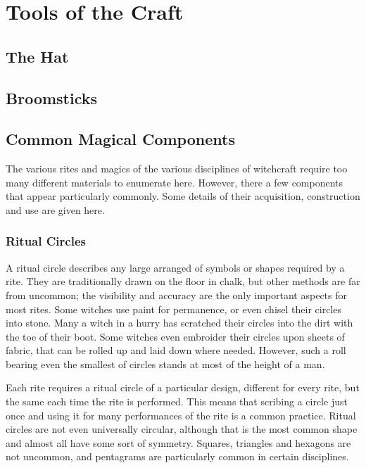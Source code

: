 \chapter{Tools of the Craft}

\section{The Hat}



\section{Broomsticks}



\section{Common Magical Components}

The various rites and magics of the various disciplines of witchcraft require too many different materials to enumerate here.
However, there a few components that appear particularly commonly.
Some details of their acquisition, construction and use are given here.

\subsection{Ritual Circles}

A ritual circle describes any large arranged of symbols or shapes required by a rite.
They are traditionally drawn on the floor in chalk, but other methods are far from uncommon; the visibility and accuracy are the only important aspects for most rites.
Some witches use paint for permanence, or even chisel their circles into stone.
Many a witch in a hurry has scratched their circles into the dirt with the toe of their boot.
Some witches even embroider their circles upon sheets of fabric, that can be rolled up and laid down where needed.
However, such a roll bearing even the smallest of circles stands at most of the height of a man.

Each rite requires a ritual circle of a particular design, different for every rite, but the same each time the rite is performed.
This means that scribing a circle just once and using it for many performances of the rite is a common practice.
Ritual circles are not even universally circular, although that is the most common shape and almost all have some sort of symmetry.
Squares, triangles and hexagons are not uncommon, and pentagrams are particularly common in certain disciplines.

